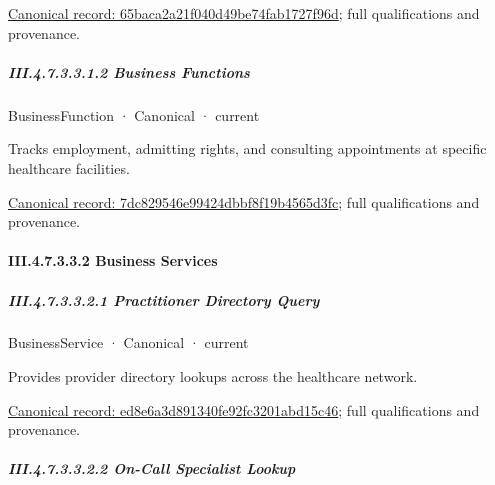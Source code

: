 {\footnotesize \href{../../../../../../../../continuum/business/business-service/65baca2a21f040d49be74fab1727f96d.md}{Canonical record: 65baca2a21f040d49be74fab1727f96d}; full qualifications and provenance.}\par
\subparagraph*{III.4.7.3.3.1.2 Business Functions}
\label{navigation:III.4.7.3.3.1.2}

\label{navigation:III.4.7.3.3.1.2.1}

\label{element:7dc829546e99424dbbf8f19b4565d3fc}
{\small BusinessFunction · Canonical · current}\par

Tracks employment, admitting rights, and consulting appointments at specific healthcare facilities.


{\footnotesize \href{../../../../../../../../continuum/business/business-function/7dc829546e99424dbbf8f19b4565d3fc.md}{Canonical record: 7dc829546e99424dbbf8f19b4565d3fc}; full qualifications and provenance.}\par
\paragraph*{III.4.7.3.3.2 Business Services}
\label{navigation:III.4.7.3.3.2}

\subparagraph*{III.4.7.3.3.2.1 Practitioner Directory Query}
\label{navigation:III.4.7.3.3.2.1}

\label{element:ed8e6a3d891340fe92fc3201abd15c46}
{\small BusinessService · Canonical · current}\par

Provides provider directory lookups across the healthcare network.


{\footnotesize \href{../../../../../../../../continuum/business/business-service/ed8e6a3d891340fe92fc3201abd15c46.md}{Canonical record: ed8e6a3d891340fe92fc3201abd15c46}; full qualifications and provenance.}\par
\subparagraph*{III.4.7.3.3.2.2 On-Call Specialist Lookup}
\label{navigation:III.4.7.3.3.2.2}


